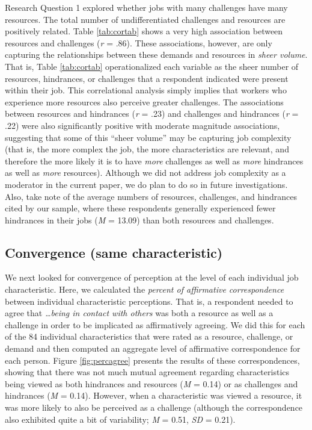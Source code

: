 \documentclass[
  man]{apa6}
\begin{document}
Research Question 1 explored whether jobs with many challenges have many resources. The total number of undifferentiated challenges and resources are positively related. Table \ref{tab:cortab} shows a very high association between resources and challenges (\emph{r} = .86). These associations, however, are only capturing the relationships between these demands and resources in \emph{sheer volume}. That is, Table \ref{tab:cortab} operationalized each variable as the sheer number of resources, hindrances, or challenges that a respondent indicated were present within their job. This correlational analysis simply implies that workers who experience more resources also perceive greater challenges. The associations between resources and hindrances (\emph{r} = .23) and challenges and hindrances (\emph{r} = .22) were also significantly positive with moderate magnitude associations, suggesting that some of this ``sheer volume'' may be capturing job complexity (that is, the more complex the job, the more characteristics are relevant, and therefore the more likely it is to have \emph{more} challenges as well as \emph{more} hindrances as well as \emph{more} resources). Although we did not address job complexity as a moderator in the current paper, we do plan to do so in future investigations. Also, take note of the average numbers of resources, challenges, and hindrances cited by our sample, where these respondents generally experienced fewer hindrances in their jobs (\emph{M} = 13.09) than both resources and challenges.

\hypertarget{convergence-same-characteristic}{%
\subsection{Convergence (same characteristic)}\label{convergence-same-characteristic}}

We next looked for convergence of perception at the level of each individual job characteristic. Here, we calculated the \emph{percent of affirmative correspondence} between individual characteristic perceptions. That is, a respondent needed to agree that \emph{\ldots being in contact with others} was both a resource as well as a challenge in order to be implicated as affirmatively agreeing. We did this for each of the 84 individual characteristics that were rated as a resource, challenge, or demand and then computed an aggregate level of affirmative correspondence for each person. Figure \ref{fig:percagree} presents the results of these correspondences, showing that there was not much mutual agreement regarding characteristics being viewed as both hindrances and resources (\emph{M} = 0.14) or as challenges and hindrances (\emph{M} = 0.14). However, when a characteristic was viewed a resource, it was more likely to also be perceived as a challenge (although the correspondence also exhibited quite a bit of variability; \emph{M} = 0.51, \emph{SD} = 0.21).
\end{document}
